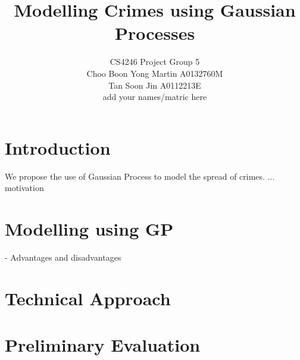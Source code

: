 \documentclass{article}
\title{Modelling Crimes using Gaussian Processes}
\author{CS4246 Project Group 5 \\
Choo Boon Yong Martin A0132760M \\
Tan Soon Jin A0112213E \\
add your names/matric here}
\begin{document}
\maketitle

\section{Introduction}
We propose the use of Gaussian Process to model the spread of crimes.
...
motivation

\section{Modelling using GP}
- Advantages and disadvantages

\section{Technical Approach}

\section{Preliminary Evaluation}
\end{document}
